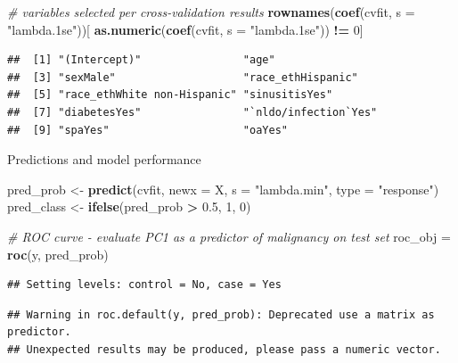 \documentclass[
]{article}
\newenvironment{Shaded}{\begin{snugshade}}{\end{snugshade}}
\newcommand{\AttributeTok}[1]{\textcolor[rgb]{0.13,0.29,0.53}{#1}}
\newcommand{\CommentTok}[1]{\textcolor[rgb]{0.56,0.35,0.01}{\textit{#1}}}
\newcommand{\DecValTok}[1]{\textcolor[rgb]{0.00,0.00,0.81}{#1}}
\newcommand{\FloatTok}[1]{\textcolor[rgb]{0.00,0.00,0.81}{#1}}
\newcommand{\FunctionTok}[1]{\textcolor[rgb]{0.13,0.29,0.53}{\textbf{#1}}}
\newcommand{\NormalTok}[1]{#1}
\newcommand{\OtherTok}[1]{\textcolor[rgb]{0.56,0.35,0.01}{#1}}
\newcommand{\SpecialCharTok}[1]{\textcolor[rgb]{0.81,0.36,0.00}{\textbf{#1}}}
\newcommand{\StringTok}[1]{\textcolor[rgb]{0.31,0.60,0.02}{#1}}
\begin{document}
\begin{Shaded}
\begin{Highlighting}[]
\CommentTok{\# variables selected per cross{-}validation results}
\FunctionTok{rownames}\NormalTok{(}\FunctionTok{coef}\NormalTok{(cvfit, }\AttributeTok{s =} \StringTok{"lambda.1se"}\NormalTok{))[}
  \FunctionTok{as.numeric}\NormalTok{(}\FunctionTok{coef}\NormalTok{(cvfit, }\AttributeTok{s =} \StringTok{"lambda.1se"}\NormalTok{)) }\SpecialCharTok{!=} \DecValTok{0}\NormalTok{]}
\end{Highlighting}
\end{Shaded}

\begin{verbatim}
##  [1] "(Intercept)"                "age"                       
##  [3] "sexMale"                    "race_ethHispanic"          
##  [5] "race_ethWhite non-Hispanic" "sinusitisYes"              
##  [7] "diabetesYes"                "`nldo/infection`Yes"       
##  [9] "spaYes"                     "oaYes"
\end{verbatim}

Predictions and model performance

\begin{Shaded}
\begin{Highlighting}[]
\NormalTok{pred\_prob }\OtherTok{\textless{}{-}} \FunctionTok{predict}\NormalTok{(cvfit, }\AttributeTok{newx =}\NormalTok{ X, }\AttributeTok{s =} \StringTok{"lambda.min"}\NormalTok{, }\AttributeTok{type =} \StringTok{"response"}\NormalTok{)}
\NormalTok{pred\_class }\OtherTok{\textless{}{-}} \FunctionTok{ifelse}\NormalTok{(pred\_prob }\SpecialCharTok{\textgreater{}} \FloatTok{0.5}\NormalTok{, }\DecValTok{1}\NormalTok{, }\DecValTok{0}\NormalTok{)}

\CommentTok{\# ROC curve {-} evaluate PC1 as a predictor of malignancy on test set}
\NormalTok{roc\_obj }\OtherTok{=} \FunctionTok{roc}\NormalTok{(y, pred\_prob)}
\end{Highlighting}
\end{Shaded}

\begin{verbatim}
## Setting levels: control = No, case = Yes
\end{verbatim}

\begin{verbatim}
## Warning in roc.default(y, pred_prob): Deprecated use a matrix as predictor.
## Unexpected results may be produced, please pass a numeric vector.
\end{verbatim}
\end{document}

